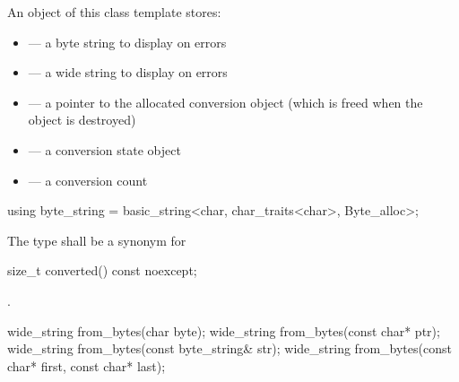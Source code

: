 \pnum
An object of this class template stores:

\begin{itemize}
\item {} --- a byte string to display on errors
\item {} --- a wide string to display on errors
\item {} --- a pointer to the allocated conversion object
(which is freed when the  object is destroyed)
\item {} --- a conversion state object
\item {} --- a conversion count
\end{itemize}

%
\begin{itemdecl}
using byte_string = basic_string<char, char_traits<char>, Byte_alloc>;
\end{itemdecl}

\begin{itemdescr}
\pnum
The type shall be a synonym for 
\end{itemdescr}

%
\begin{itemdecl}
size_t converted() const noexcept;
\end{itemdecl}

\begin{itemdescr}
\pnum
\returns {}.
\end{itemdescr}

%
\begin{itemdecl}
wide_string from_bytes(char byte);
wide_string from_bytes(const char* ptr);
wide_string from_bytes(const byte_string& str);
wide_string from_bytes(const char* first, const char* last);
\end{itemdecl}


